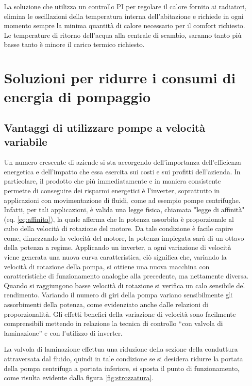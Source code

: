 \documentclass[laurea,oneside,11pt]{USiena_tesiLM}
\begin{document}

La soluzione che utilizza un controllo PI per regolare il calore fornito ai radiatori, elimina le oscillazioni della temperatura interna dell'abitazione e richiede in ogni momento sempre la minima quantità di calore necessario per il comfort richiesto. Le temperature di ritorno dell'acqua alla centrale di scambio, saranno tanto più basse tanto è minore il carico termico richiesto. 

 


\section{Soluzioni per ridurre i consumi di energia di pompaggio}

\subsection{Vantaggi di utilizzare pompe a velocità variabile}
Un numero crescente di aziende si sta accorgendo dell'importanza dell'efficienza energetica e dell'impatto che essa esercita sui costi e sui profitti dell'azienda.
In particolare, il prodotto che più immediatamente e in maniera consistente permette di conseguire dei risparmi energetici è l'inverter, soprattutto in applicazioni con movimentazione di fluidi, come ad esempio pompe centrifughe. Infatti, per tali applicazioni, è valida una legge fisica, chiamata "legge di affinità" (eq. \ref{eq:affinita}), la quale afferma che la potenza assorbita è proporzionale al cubo della velocità di rotazione del motore. Da tale condizione è facile capire come, dimezzando la velocità del motore, la potenza impiegata sarà di un ottavo della potenza a regime. 
Applicando un inverter, a ogni variazione di velocità viene generata una nuova curva caratteristica, ciò significa che, variando la velocità di rotazione della pompa, si ottiene una nuova macchina con caratteristiche di funzionamento analoghe alla precedente, ma nettamente diversa. Quando si raggiungono basse velocità di rotazione si verifica un calo sensibile del rendimento. Variando il numero di giri della pompa variano sensibilmente gli assorbimenti della potenza, come evidenziato anche dalle relazioni di proporzionalità. Gli effetti benefici della variazione di velocità sono facilmente comprensibili mettendo in relazione la tecnica di controllo “con valvola di laminazione” e con l’utilizzo di inverter. 

La valvola di laminazione effettua una riduzione della sezione della conduttura attraversata dal fluido, quindi in tale condizione se si desidera ridurre la portata della pompa centrifuga a portata inferiore, si sposta il punto di funzionamento, come risulta evidente dalla figura \ref{fig:strozzatura}.
\end{document}
